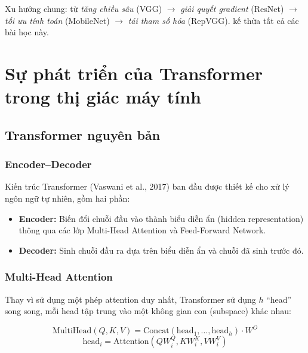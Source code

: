 Xu hướng chung: từ \textit{tăng chiều sâu} (VGG) $\to$ \textit{giải quyết gradient} (ResNet) $\to$ \textit{tối ưu tính toán} (MobileNet) $\to$ \textit{tái tham số hóa} (RepVGG). \fastvit{} kế thừa tất cả các bài học này.

\section{Sự phát triển của Transformer trong thị giác máy tính}
\label{sec:transformer_evolution}

\subsection{Transformer nguyên bản}
\label{subsec:transformer_original}

\subsubsection*{Encoder--Decoder}

Kiến trúc Transformer \cite{transformer2017} (Vaswani et al., 2017) ban đầu được thiết kế cho xử lý ngôn ngữ tự nhiên, gồm hai phần:

\begin{itemize}
    \item \textbf{Encoder:} Biến đổi chuỗi đầu vào thành biểu diễn ẩn (hidden representation) thông qua các lớp Multi-Head Attention và Feed-Forward Network.
    \item \textbf{Decoder:} Sinh chuỗi đầu ra dựa trên biểu diễn ẩn và chuỗi đã sinh trước đó.
\end{itemize}

\subsubsection*{Multi-Head Attention}

Thay vì sử dụng một phép attention duy nhất, Transformer sử dụng $h$ ``head'' song song, mỗi head tập trung vào một không gian con (subspace) khác nhau:

\begin{equation}
    \text{MultiHead}(Q, K, V) = \text{Concat}(\text{head}_1, \ldots, \text{head}_h) \cdot W^O
\end{equation}
\begin{equation}
    \text{head}_i = \text{Attention}(Q W_i^Q, K W_i^K, V W_i^V)
\end{equation}

